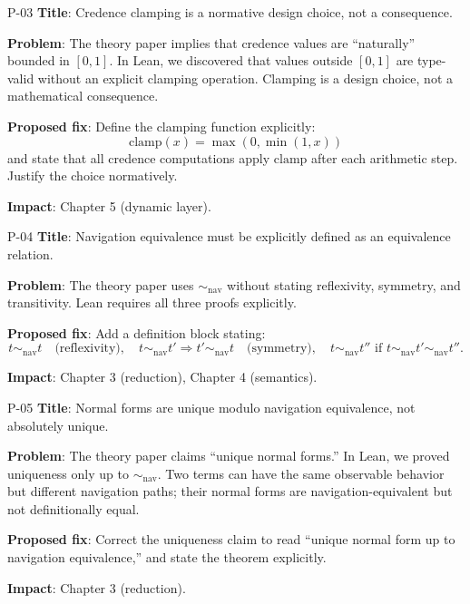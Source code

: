 \begin{proposal}{P-03}
\textbf{Title}: Credence clamping is a normative design choice, not a consequence.

\noindent\textbf{Problem}: The theory paper implies that credence values are
``naturally'' bounded in $[0,1]$. In Lean, we discovered that values outside
$[0,1]$ are type-valid without an explicit clamping operation. Clamping is a
design choice, not a mathematical consequence.

\noindent\textbf{Proposed fix}: Define the clamping function explicitly:
\[
\mathrm{clamp}(x) = \max(0, \min(1, x))
\]
and state that all credence computations apply $\mathrm{clamp}$ after each
arithmetic step. Justify the choice normatively.

\noindent\textbf{Impact}: Chapter 5 (dynamic layer).
\end{proposal}

\begin{proposal}{P-04}
\textbf{Title}: Navigation equivalence must be explicitly defined as an equivalence relation.

\noindent\textbf{Problem}: The theory paper uses $\sim_\mathrm{nav}$ without
stating reflexivity, symmetry, and transitivity. Lean requires all three proofs
explicitly.

\noindent\textbf{Proposed fix}: Add a definition block stating:
\[
t \sim_\mathrm{nav} t \quad \text{(reflexivity)},
\quad t \sim_\mathrm{nav} t' \Rightarrow t' \sim_\mathrm{nav} t \quad \text{(symmetry)},
\quad t \sim_\mathrm{nav} t'' \text{ if } t \sim_\mathrm{nav} t' \sim_\mathrm{nav} t''.
\]

\noindent\textbf{Impact}: Chapter 3 (reduction), Chapter 4 (semantics).
\end{proposal}

\begin{proposal}{P-05}
\textbf{Title}: Normal forms are unique modulo navigation equivalence, not absolutely unique.

\noindent\textbf{Problem}: The theory paper claims ``unique normal forms.'' In
Lean, we proved uniqueness only up to $\sim_\mathrm{nav}$. Two terms can have
the same observable behavior but different navigation paths; their normal forms
are navigation-equivalent but not definitionally equal.

\noindent\textbf{Proposed fix}: Correct the uniqueness claim to read ``unique
normal form up to navigation equivalence,'' and state the theorem explicitly.

\noindent\textbf{Impact}: Chapter 3 (reduction).
\end{proposal}

